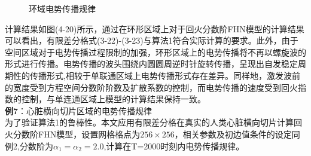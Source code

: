 \documentclass[twoside,UTF8]{nputhesis}
\begin{document}
\begin{figure}[htbp]
{	}
	\setlength{\abovecaptionskip}{-0.2cm} %
	\caption{环域电势传播规律}
	\label{fig:1a}	
	\vspace{-0.5cm} %

\end{figure}

\renewcommand{\figurename}{图}
计算结果如图(4-20)所示，通过在环形区域上对于回火分数阶FHN模型的计算结果可以看出，有限差分格式(3-22)-(3-23)与算法1符合实际计算的要求。此外，由于空间区域对于电势传播过程限制的加强，环形区域上的电势传播将不再以螺旋波的形式进行传播。电势传播的波头围绕内圆圆周逆时针旋转传播，呈现出自发稳定周期性的传播形式,相较于单联通区域上电势传播形式存在差异。同样地，激发波前的宽度受到方程空间分数阶阶数及扩散系数的控制，而电势传播的速度受到回火指数的控制，与单连通区域上模型的计算结果保持一致。\\
\noindent   %
\textbf{例7}：心脏横向切片区域的电势传播规律\\
为了验证算法1的鲁棒性。本文应用有限差分格在真实的人类心脏横向切片计算回火分数阶FHN模型，设置网格格点为$256\times 256$，相关参数及初边值条件的设定同例2,分数阶为${{\alpha }_{1}}={{\alpha }_{2}}=2.0$,计算在T=2000时刻内电势传播规律。
\end{document}
